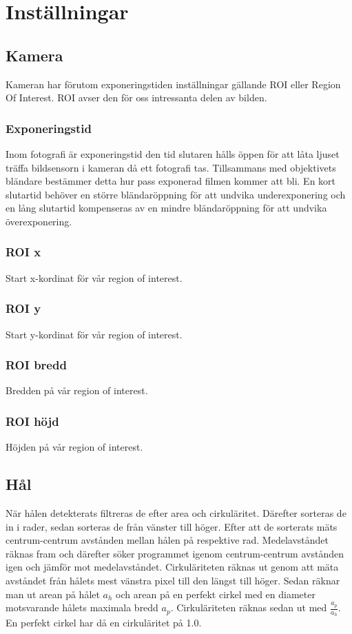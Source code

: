 \documentclass[a4paper]{article}
\begin{document}
\section{Inställningar}
	\subsection{Kamera}
		Kameran har förutom exponeringstiden inställningar gällande ROI eller Region Of Interest. ROI avser den för oss intressanta delen av bilden. 

	    \subsubsection{Exponeringstid}
		  Inom fotografi är exponeringstid den tid slutaren hålls öppen för att låta ljuset träffa bildsensorn i kameran då ett fotografi tas. 
		  Tillsammans med objektivets bländare bestämmer detta hur pass exponerad filmen kommer att bli. 
		  En kort slutartid behöver en större bländaröppning för att undvika underexponering och en lång slutartid kompenseras av en mindre bländaröppning för att undvika överexponering.

	    \subsubsection{ROI x}
		  Start x-kordinat för vår region of interest.

	    \subsubsection{ROI y}
		  Start y-kordinat för vår region of interest.

	    \subsubsection{ROI bredd}
		  Bredden på vår region of interest.

	    \subsubsection{ROI höjd}
		  Höjden på vår region of interest.

	\subsection{Hål}
		När hålen detekterats filtreras de efter area och cirkuläritet. Därefter sorteras de in i rader, sedan sorteras de från vänster till höger.
		Efter att de sorterats mäts centrum-centrum avstånden mellan hålen på respektive rad. Medelavståndet räknas fram och därefter söker programmet igenom
		centrum-centrum avstånden igen och jämför mot medelavståndet. \newline\newline
		Cirkuläriteten räknas ut genom att mäta avståndet från hålets mest vänstra pixel till den längst till höger. Sedan räknar man ut arean på hålet $a_h$ och 
		arean på en perfekt cirkel med en diameter motsvarande hålets maximala bredd $a_p$. Cirkuläriteten räknas sedan ut med $\frac{a_p}{a_h}$. En perfekt cirkel har då en cirkuläritet på 1.0.
\end{document}
